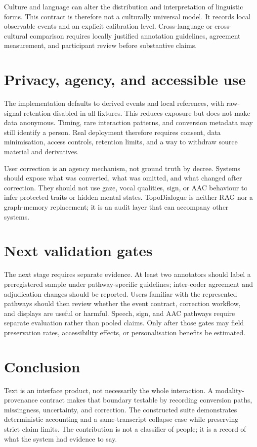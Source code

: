 \documentclass[11pt,a4paper]{article}
\begin{document}
Culture and language can alter the distribution and interpretation of linguistic forms. This contract is therefore not a culturally universal model. It records local observable events and an explicit calibration level. Cross-language or cross-cultural comparison requires locally justified annotation guidelines, agreement measurement, and participant review before substantive claims.

\section{Privacy, agency, and accessible use}
The implementation defaults to derived events and local references, with raw-signal retention disabled in all fixtures. This reduces exposure but does not make data anonymous. Timing, rare interaction patterns, and conversion metadata may still identify a person. Real deployment therefore requires consent, data minimisation, access controls, retention limits, and a way to withdraw source material and derivatives.

User correction is an agency mechanism, not ground truth by decree. Systems should expose what was converted, what was omitted, and what changed after correction. They should not use gaze, vocal qualities, sign, or AAC behaviour to infer protected traits or hidden mental states. TopoDialogue is neither RAG nor a graph-memory replacement; it is an audit layer that can accompany other systems.

\section{Next validation gates}
The next stage requires separate evidence. At least two annotators should label a preregistered sample under pathway-specific guidelines; inter-coder agreement and adjudication changes should be reported. Users familiar with the represented pathways should then review whether the event contract, correction workflow, and displays are useful or harmful. Speech, sign, and AAC pathways require separate evaluation rather than pooled claims. Only after those gates may field preservation rates, accessibility effects, or personalisation benefits be estimated.

\section{Conclusion}
Text is an interface product, not necessarily the whole interaction. A modality-provenance contract makes that boundary testable by recording conversion paths, missingness, uncertainty, and correction. The constructed suite demonstrates deterministic accounting and a same-transcript collapse case while preserving strict claim limits. The contribution is not a classifier of people; it is a record of what the system had evidence to say.



\end{document}
